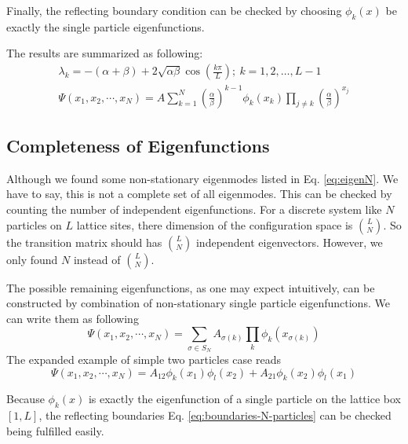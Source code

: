 \documentclass[12pt,a4paper]{article}
\begin{document}
Finally, the reflecting boundary condition can be checked by choosing
$\phi_k(x)$ be exactly the single particle eigenfunctions.

The results are summarized as following:  
\begin{subequations}
    \label{eq:eigenN}
    \begin{eqnarray}
        \label{eq:eigenvaluesN}
        \lambda_k  = 
        -(\alpha+\beta) + 2\sqrt{\alpha\beta}\cos(\frac{k\pi}{L});
        ~k=1,2,\dots, L-1  \\
        \label{eq:eigenvectorsN}
        \Psi(x_1, x_2, \cdots, x_N)  =  A \sum_{k=1}^N
        \left(\frac{\alpha}{\beta}\right)^{k-1} \phi_k(x_k)\prod_{j\neq k} 
         \left(\frac{\alpha}{\beta}\right)^{x_j}
    \end{eqnarray}
\end{subequations}


\subsection{Completeness of Eigenfunctions}
\label{sub:completeness_of_eigenfunctions}

Although we found some non-stationary eigenmodes listed in Eq.
\eqref{eq:eigenN}. We have to say, this is not a complete set of all
eigenmodes. This can be checked by counting the number of independent
eigenfunctions. For a discrete system like $N$ particles on $L$ lattice sites,
there dimension of the configuration space is $\binom{L}{N}$. So the transition
matrix should has $\binom{L}{N}$ independent eigenvectors. However, we only
found $N$ instead of $\binom{L}{N}$.

The possible remaining eigenfunctions, as one may expect intuitively, can be
constructed by combination of non-stationary single particle eigenfunctions. 
We can write them as following
\begin{equation}
    \label{eq:possibleEigenModes}
    \Psi(x_1, x_2, \cdots, x_N) = \sum_{\sigma\in S_N}
    A_{\sigma(k)}\prod_{k} \phi_k(x_{\sigma(k)})
\end{equation}
The expanded example of simple two particles case reads
\begin{equation}
    \label{eq:possibleEigenModesTwo}
    \Psi(x_1, x_2, \cdots, x_N) = A_{12}\phi_k(x_1)\phi_l(x_2)
    + A_{21}\phi_k(x_2)\phi_l(x_1)
\end{equation}

Because $\phi_k(x)$ is exactly the eigenfunction of a single particle on the
lattice box $[1,L]$, the reflecting boundaries Eq.
\eqref{eq:boundaries-N-particles} can be checked being fulfilled easily. 
\end{document}
